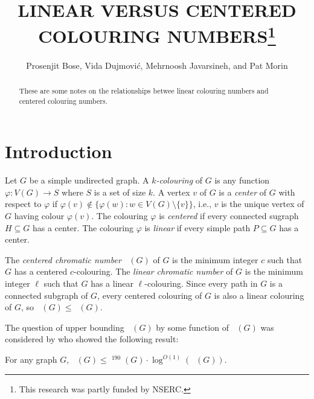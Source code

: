 \documentclass{patmorin}
\title{\MakeUppercase{Linear versus Centered Colouring Numbers}\thanks{This research was partly funded by NSERC.}}
\author{Prosenjit Bose, Vida Dujmović, Mehrnoosh Javarsineh, and Pat Morin}
\date{}
\DeclareMathOperator{\chicen}{\chi_{\mathrm{cen}}}
\DeclareMathOperator{\chilin}{\chi_{\mathrm{lin}}}
\begin{document}
\maketitle

\begin{abstract}
    These are some notes on the relationships betwee linear colouring numbers and centered colouring numbers.
\end{abstract}

%



\section{Introduction}

Let $G$ be a simple undirected graph.  A \emph{$k$-colouring} of $G$ is any function $\varphi:V(G)\to S$ where $S$ is a set of size $k$.  A vertex $v$ of $G$ is a \emph{center} of $G$ with respect to $\varphi$ if $\varphi(v)\not\in\{\varphi(w):w\in V(G)\setminus\{v\}\}$, i.e., $v$ is the unique vertex of $G$ having colour $\varphi(v)$.  The colouring $\varphi$ is \emph{centered} if every connected sugraph $H\subseteq G$ has a center.  The colouring $\varphi$ is \emph{linear} if every simple path $P\subseteq G$ has a center. 

The \emph{centered chromatic number} $\chicen(G)$ of $G$ is the minimum integer $c$ such that $G$ has a centered $c$-colouring.  The \emph{linear chromatic number} of $G$ is the minimum integer $\ell$ such that $G$ has a linear $\ell$-colouring.  Since every path in $G$ is a connected subgraph of $G$, every centered colouring of $G$ is also a linear colouring of $G$, so $\chilin(G)\le\chicen(G)$.

The question of upper bounding $\chicen(G)$ by some function of $\chilin(G)$ was considered by \citet[Theorem~1]{kun.obrien.ea:polynomial} who showed the following result:

\begin{thm}\label{kun-obrien-general}
  For any graph $G$, $\chicen(G)\le \chilin^{190}(G)\cdot\log^{O(1)}(\chilin(G))$.  
\end{thm}
  
\end{document}
